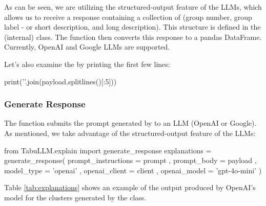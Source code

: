 \documentclass[article]{jss}
\begin{document}
As can be seen, we are utilizing the structured-output feature of the LLMs, which allows us to receive a response containing a collection of (group number, group label - or short description, and long description). This structure is defined in the  (internal) class. The function then converts this response to a pandas DataFrame. Currently, OpenAI and Google LLMs are supported.

Let's also examine the  by printing the first few lines:
\begin{pyblock}
print('\n'.join(payload.splitlines()[:5]))
\end{pyblock}
\stdoutpythontex %

\subsubsection{Generate Response}\label{subsubsec:using-explain-response}

The  function submits the prompt generated by  to an LLM (OpenAI or Google). As mentioned, we take advantage of the structured-output feature of the LLMs:
\begin{pyverbatim}
from TabuLLM.explain import generate_response
explanations = generate_response(
    prompt_instructions = prompt
    , prompt_body = payload
    , model_type = 'openai'
    , openai_client = client
    , openai_model = 'gpt-4o-mini'
)
\end{pyverbatim}

Table \ref{tab:explanations} shows an example of the output produced by OpenAI's  model for the clusters generated by the  class.
\end{document}
